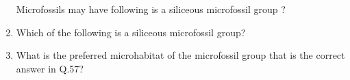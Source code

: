 \documentclass[journal,12pt,onecolumn]{IEEEtran}
\theoremstyle{remark}
\begin{document}
\begin{enumerate}
    Microfossils may have following is a siliceous microfossil group ?
    \item Which of the following is a siliceous microfossil group? \hfill{} 

            \begin {enumerate}
            \end{enumerate}
    \item What is the preferred microhabitat of the microfossil group that is the correct answer in Q.57? \hfill{} 
            \begin {enumerate}
            \end{enumerate}

\end{enumerate}
\end{document}
